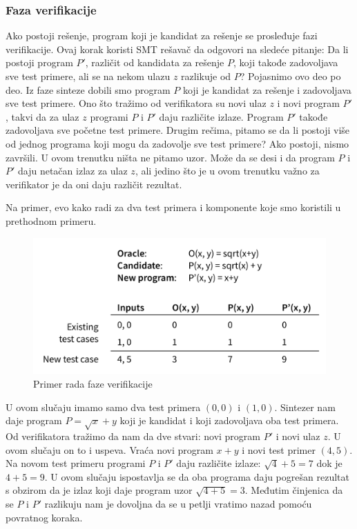 \subsubsection*{Faza verifikacije}

Ako postoji rešenje, program koji je kandidat za rešenje se prosleđuje fazi verifikacije. Ovaj korak koristi SMT rešavač da odgovori na sledeće pitanje: Da li postoji program $P'$, različit od kandidata za rešenje $P$, koji takođe zadovoljava sve test primere, ali se na nekom ulazu $z$ razlikuje od $P$?
Pojasnimo ovo deo po deo. Iz faze sinteze dobili smo program $P$ koji je kandidat za rešenje i zadovoljava sve test primere. Ono što tražimo od verifikatora su novi ulaz $z$ i novi program $P'$, takvi da za ulaz $z$ programi $P$ i $P'$ daju različite izlaze. Program $P'$ takođe zadovoljava sve početne test primere.
Drugim rečima, pitamo se da li postoji više od jednog programa koji mogu da zadovolje sve test primere? Ako postoji, nismo završili.
U ovom trenutku ništa ne pitamo uzor. Može da se desi i da program $P$ i $P'$ daju netačan izlaz za ulaz $z$, ali jedino što je u ovom trenutku važno za verifikator je da oni daju različit rezultat.

Na primer, evo kako radi za dva test primera i komponente koje smo koristili u prethodnom primeru.

\begin{figure}[h!]
    \begin{center}
        \includegraphics[scale=0.6]{resources/oracle-table.png}
    \end{center}
    \caption{Primer rada faze verifikacije}
    \label{fig:oraclePrimer1}
\end{figure}

U ovom slučaju imamo samo dva test primera $(0,0)$ i $(1,0)$. Sintezer nam daje program $P=\sqrt{x}+y$ koji je kandidat i koji zadovoljava oba test primera. Od verifikatora tražimo da nam da dve stvari: novi program $P'$ i novi ulaz $z$. U ovom slučaju on to i uspeva. Vraća novi program $x+y$ i novi test primer $(4,5)$. Na novom test primeru programi $P$ i $P'$ daju različite izlaze: $\sqrt{4}+5=7$ dok je $4+5=9$. U ovom slučaju ispostavlja se da oba programa daju pogrešan rezultat s obzirom da je izlaz koji daje program uzor $\sqrt{4+5}=3$. Međutim činjenica da se $P$ i $P'$ razlikuju nam je dovoljna da se u petlji vratimo nazad pomoću povratnog koraka.


